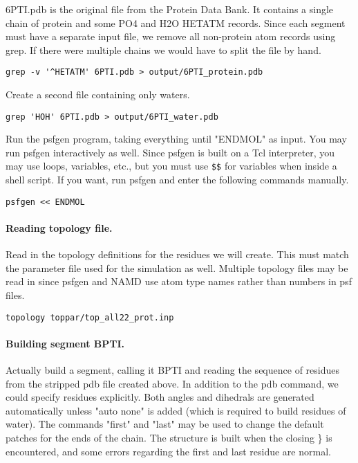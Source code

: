 6PTI.pdb is the original file from the Protein Data Bank.  It contains
a single chain of protein and some PO4 and H2O HETATM records.  Since
each segment must have a separate input file, we remove all non-protein
atom records using grep.  If there were multiple chains we would have
to split the file by hand.
\begin{verbatim}
grep -v '^HETATM' 6PTI.pdb > output/6PTI_protein.pdb
\end{verbatim}

Create a second file containing only waters.
\begin{verbatim}
grep 'HOH' 6PTI.pdb > output/6PTI_water.pdb
\end{verbatim}


Run the psfgen program, taking everything until "ENDMOL" as input.
You may run psfgen interactively as well.  Since psfgen is built on
a Tcl interpreter, you may use loops, variables, etc., but you must
use \verb#$$# for variables when inside a shell script.  If you
want, run psfgen and enter the following commands manually.

\begin{verbatim}
psfgen << ENDMOL
\end{verbatim}

\paragraph*{Reading topology file.}

Read in the topology definitions for the residues we will create.
This must match the parameter file used for the simulation as well.
Multiple topology files may be read in since psfgen and NAMD use atom
type names rather than numbers in psf files.

\begin{verbatim}
topology toppar/top_all22_prot.inp
\end{verbatim}

\paragraph*{Building segment BPTI.}


Actually build a segment, calling it BPTI and reading the sequence
of residues from the stripped pdb file created above.  In addition to
the pdb command, we could specify residues explicitly.  Both angles
and dihedrals are generated automatically unless "auto none" is added
(which is required to build residues of water).  The commands "first"
and "last" may be used to change the default patches for the ends of
the chain.  The structure is built when the closing \} is encountered,
and some errors regarding the first and last residue are normal.

